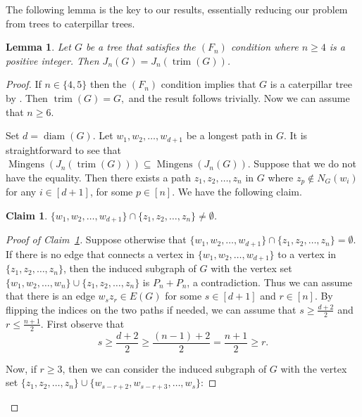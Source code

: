 \documentclass{amsart}
\newtheorem{lemma}[theorem]{Lemma}
\newtheorem{claim}[theorem]{Claim}
\theoremstyle{remark}
\theoremstyle{definition}
\DeclareMathOperator{\mingens}{Mingens}
\DeclareMathOperator{\diam}{diam}
\DeclareMathOperator{\trim}{trim}
\begin{document}
	The following lemma is the key to our results, essentially reducing our problem from trees to caterpillar trees.
	
	
	\begin{lemma}\label{lem:G->trim(G)}
		Let $G$ be a tree that satisfies the $(F_n)$ condition where $n\geq 4$ is a positive integer. Then $J_n(G)=J_n(\trim(G))$.
	\end{lemma}
	\begin{proof}
		If $n\in \{4,5\}$ then the $(F_n)$ condition implies that $G$ is a caterpillar tree by \cite[Theorem~1]{HS71}. Then $\trim(G)=G,$ and the result follows trivially. Now we can assume that $n\geq 6$.
		
		Set $d=\diam(G)$. Let $w_1,w_2,\dots, w_{d+1}$ be a longest path in $G$.  
		It is straightforward to see that $\mingens(J_n(\trim(G)))\subseteq \mingens(J_n(G))$. Suppose that we do not have the equality. Then there exists a path $z_1,z_2,\dots, z_n$ in $G$ where $z_p\notin N_G(w_i)$  for any $i\in [d+1]$, for some $p\in [n]$. We have the following claim.
		\begin{claim}\label{clm:n-path-does-not-intersect-longest-path}
			$\{w_1,w_2,\dots , w_{d+1}\}\cap \{z_1,z_2,\dots, z_n\}\neq \emptyset$.
		\end{claim}
		\begin{proof}[Proof of Claim~\ref{clm:n-path-does-not-intersect-longest-path}]
			Suppose otherwise that $\{w_1,w_2,\dots , w_{d+1}\}\cap \{z_1,z_2,\dots, z_n\}= \emptyset$. If there is no edge that connects a vertex in $\{w_1,w_2,\dots, w_{d+1}\}$ to a vertex in $\{z_1,z_2,\dots, z_n\}$, then the induced subgraph of $G$ with the vertex set $\{w_1,w_2,\dots, w_n\}\cup \{z_1,z_2,\dots, z_n\}$ is $P_n+P_n$, a contradiction. Thus we can assume that there is an edge $w_sz_r\in E(G)$ for some $s\in [d+1]$ and $r\in [n]$. By flipping the indices on the two paths if needed, we can assume that $s\geq \frac{d+2}{2}$ and $r\leq \frac{n+1}{2}$. First observe that
			\begin{equation*}
				s\geq \frac{d+2}{2}\geq \frac{(n-1)+2}{2}=\frac{n+1}{2}\geq r. \tag{1}
			\end{equation*}
			
            Now, if $r\geq 3$, then we can consider the induced subgraph of $G$ with the vertex set $\{z_1,z_2,\dots, z_n\}\cup \{w_{s-r+2}, w_{s-r+3}, \dots, w_s\}$:
			

\end{proof}
\end{proof}
\end{document}
